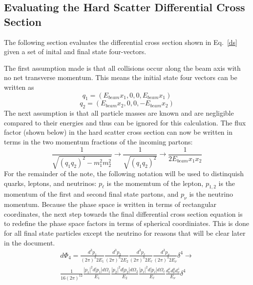 \subsection{Evaluating the Hard Scatter Differential Cross Section}

The following section evaluates the differential cross section shown
in Eq.~\ref{ds} given a set of inital and final state four-vectors.

The first assumption made is that all collisions occur along the beam
axis with no net transverse momentum. This means the initial state
four vectors can be written as
\begin{equation}
q_{1} = ( E_{beam} x_{1}, 0, 0, E_{beam} x_{1} )
\end{equation}
\begin{equation}
q_{2} = ( E_{beam} x_{2}, 0, 0, -E_{beam} x_{2} )
\end{equation}
\noindent The next assumption is that all particle masses are known
and are negligible compared to their energies and thus can be ignored
for this calculation. The flux factor (shown below) in the hard
scatter cross section can now be written in terms in the two momentum
fractions of the incoming partons:
\begin{equation}
\frac{1}{\sqrt{(q_{1}q_{2})^2 - m_{1}^2m_{2}^2}} \rightarrow
\frac{1}{\sqrt{(q_{1}q_{2})^2}} \rightarrow
\frac{1}{2E_{beam}x_{1}x_{2}}
\end{equation}
\noindent For the remainder of the note, the following notation will
be used to distinquish quarks, leptons, and neutrinos: $p_{\ell}$ is
the momemtum of the lepton, $p_{1,2}$ is the momentum of the first and
second final state partons, and $p_{\nu}$ is the neutrino
momentum. Because the phase space is written in terms of rectangular
coordinates, the next step towards the final differential cross
section equation is to redefine the phase space factors in terms of
spherical coordiniates. This is done for all final state particles
except the neutrino for reasons that will be clear later in the
document.
\begin{eqnarray}
d\Phi_{4} = 
\frac{d^{3}p_{1}}{(2\pi)^3 2E_{1}}
\frac{d^{3}p_{2}}{(2\pi)^3 2E_{2}}
\frac{d^{3}p_{\ell}}{(2\pi)^3 2E_{\ell}}
\frac{d^{3}p_{\nu}}{(2\pi)^3 2E_{\nu}} \delta^{4} 
\rightarrow \\
\frac{1}{16(2\pi)^{12}}
\frac{|p_{1}|^{2}d|p_{1}|d\Omega_{1}}{E_{1}}
\frac{|p_{2}|^{2}d|p_{2}|d\Omega_{2}}{E_{2}}
\frac{|p_{\ell}|^{2}d|p_{\ell}|d\Omega_{\ell}}{E_{\ell}}
\frac{d^{x}_{\nu} d^{y}_{\nu} d^{z}_{\nu}}{E_{\nu}}\delta^{4} 
\end{eqnarray}
